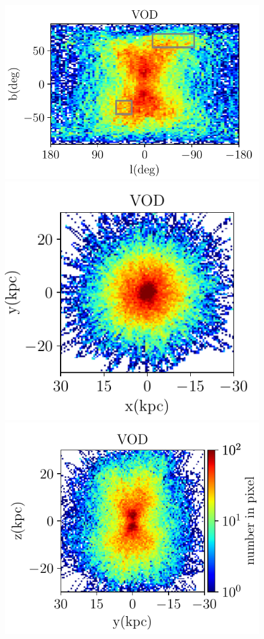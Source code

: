 \documentclass[fleqn,usenatbib]{mnras}
\begin{document}
\begin{figure}
	     	     	     	     \includegraphics[scale=0.52]{VOD_orbits_8Gyrs_lb_sausage.pdf}
	     	     \includegraphics[scale=0.52]{VOD_orbits_8Gyrs_xy_sausage.pdf}
	     	     	     \includegraphics[scale=0.52]{VOD_orbits_8Gyrs_yz_sausage.pdf}

\end{figure}
\end{document}
